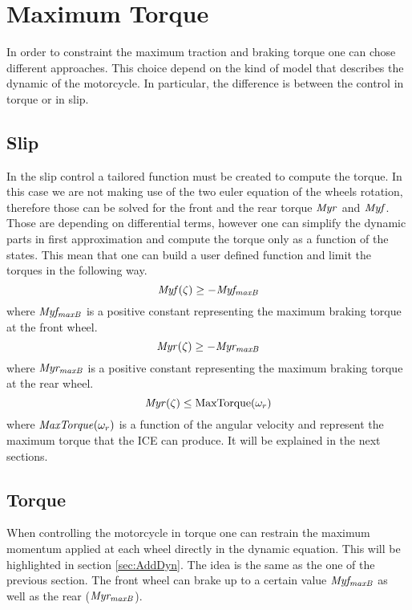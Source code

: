 \section{Maximum Torque}
% 
In order to constraint the maximum traction and braking torque one can chose different approaches. This choice depend on the kind of model that describes the dynamic of the motorcycle. In particular, the difference is between the control in torque or in slip.
%
\subsection{Slip}
%
In the slip control a tailored function must be created to compute the torque. In this case we are not making use of the two euler equation of the wheels rotation, therefore those can be solved for the front and the rear torque $\it Myr$ and $\it Myf$. Those are depending on differential terms, however one can simplify the dynamic parts in first approximation and compute the torque only as a function of the states. This mean that one can build a user defined function and limit the torques in the following way.
%
\begin{equation}
    {\it Myf}(\zeta) \ge -{\it Myf_{maxB}}
\end{equation}
%
where ${\it Myf_{maxB}}$ is a positive constant representing the maximum braking torque at the front wheel.
%
\begin{equation}
    {\it Myr}(\zeta) \ge -{\it Myr_{maxB}}
\end{equation}
%
where ${\it Myr_{maxB}}$ is a positive constant representing the maximum braking torque at the rear wheel.
%
\begin{equation}
    {\it Myr}(\zeta) \le \mathrm{MaxTorque}(\omega_r)
\end{equation}
%
where ${\it MaxTorque}(\omega_r)$ is a function of the angular velocity and represent the maximum torque that the ICE can produce. It will be explained in the next sections.
%
\subsection{Torque}
%
When controlling the motorcycle in torque one can restrain the maximum momentum applied at each wheel directly in the dynamic equation. This will be highlighted in section \ref{sec:AddDyn}. The idea is the same as the one of the previous section. The front wheel can brake up to a certain value ${\it Myf_{maxB}}$ as well as the rear (${\it Myr_{maxB}}$).
%
